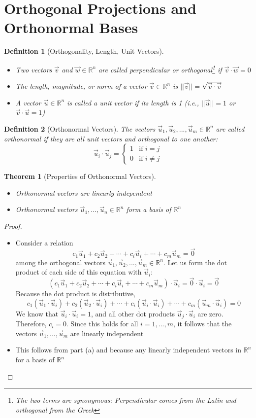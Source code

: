 \documentclass[10pt]{report}
\newtheorem{thm2}{Theorem}[section]
\newtheorem{def2}{Definition}[section]
\begin{document}
\section{Orthogonal Projections and Orthonormal Bases}
\begin{def2}[Orthogonality, Length, Unit Vectors]
\begin{itemize}
\item[a.] Two vectors $\vec{v}$ and $\vec{w}\in \mathbb{R}^n$ are called perpendicular or orthogonal\footnote{The two terms are synonymous: Perpendicular comes from the Latin and orthogonal from the Greek} if $\vec{v}\cdot \vec{w}=0$
\item[b.] The length, magnitude, or norm of a vector $\vec{v}\in \mathbb{R}^n$ is $||\vec{v}||=\sqrt{\vec{v}\cdot \vec{v}}$
\item[c.] A vector $\vec{u}\in \mathbb{R}^n$ is called a unit vector if its length is 1 (i.e., $||\vec{u}||=1$ or $\vec{v}\cdot \vec{u}=1$)
\end{itemize}
\end{def2}
\begin{def2}[Orthonormal Vectors]
The vectors $\vec{u}_1, \vec{u}_2, ..., \vec{u}_m\in \mathbb{R}^n$ are called orthonormal if they are all unit vectors and orthogonal to one another:
$$\vec{u}_i \cdot \vec{u}_j=\begin{cases}
1 & \text{if } i=j\\
0 & \text{if } i\neq j
\end{cases}$$
\end{def2}
\begin{thm2}[Properties of Orthonormal Vectors]
\begin{itemize}
\item[a.] Orthonormal vectors are linearly independent
\item[b.] Orthonormal vectors $\vec{u}_1,...,\vec{u}_n\in \mathbb{R}^n$ form a basis of $\mathbb{R}^n$
\end{itemize}
\end{thm2}
\begin{proof}
\begin{itemize}
\item[a.] Consider a relation
$$c_1\vec{u}_1 + c_2\vec{u}_2 + \cdots + c_i\vec{u}_i + \cdots + c_m\vec{u}_m = \vec{0}$$
among the orthogonal vectors $\vec{u}_1, \vec{u}_2,...,\vec{u}_m \in \mathbb{R}^n$. Let us form the dot product of each side of this equation with $\vec{u}_i$:
$$(c_1\vec{u}_1 + c_2\vec{u}_2 + \cdots + c_i\vec{u}_i + \cdots + c_m\vec{u}_m)\cdot \vec{u}_i = \vec{0}\cdot \vec{u}_i = \vec{0}$$
Because the dot product is distributive, 
$$c_1(\vec{u}_1\cdot \vec{u}_i) + c_2(\vec{u}_2\cdot \vec{u}_i) +\cdots + c_i(\vec{u}_i\cdot \vec{u}_i) + \cdots + c_m(\vec{u}_m\cdot \vec{u}_i) = 0$$
We know that $\vec{u}_i \cdot \vec{u}_i = 1$, and all other dot products $\vec{u}_j \cdot \vec{u}_i$ are zero. Therefore, $c_i=0$. Since this holds for all $i=1,...,m$, it follows that the vectors $\vec{u}_1,...,\vec{u}_m$ are linearly independent
\item[b.] This follows from part (a) and because any linearly independent vectors in $\mathbb{R}^n$ for a basis of $\mathbb{R}^n$
\end{itemize}
\end{proof}
\end{document}
